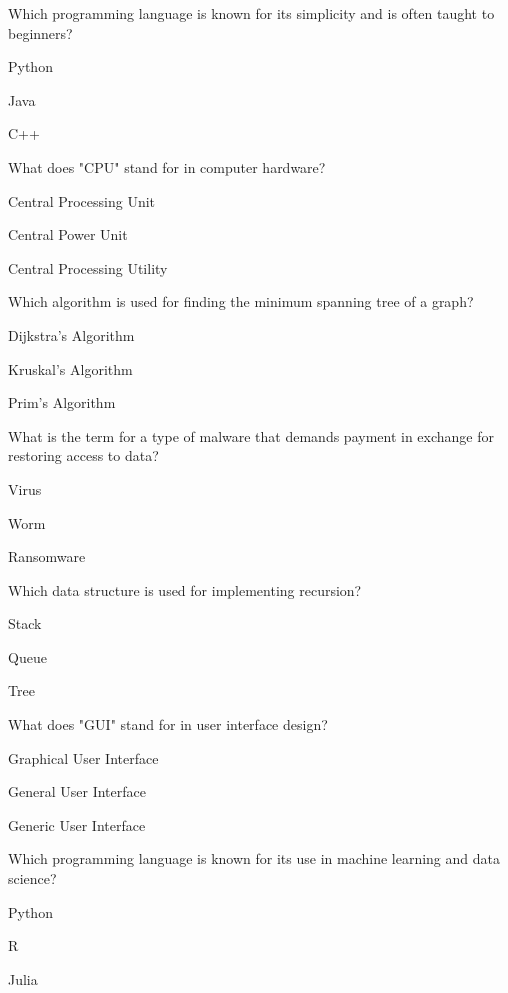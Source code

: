 \begin{enhancedmcq}{Which programming language is known for its simplicity and is often taught to beginners?}
\item Python
\item Java
\item C++

\end{enhancedmcq}
\begin{enhancedmcq}{What does "CPU" stand for in computer hardware?}
\item Central Processing Unit
\item Central Power Unit
\item Central Processing Utility

\end{enhancedmcq}
\begin{enhancedmcq}{Which algorithm is used for finding the minimum spanning tree of a graph?}
\item Dijkstra's Algorithm
\item Kruskal's Algorithm
\item Prim's Algorithm

\end{enhancedmcq}
\begin{enhancedmcq}{What is the term for a type of malware that demands payment in exchange for restoring access to data?}
\item Virus
\item Worm
\item Ransomware

\end{enhancedmcq}
\begin{enhancedmcq}{Which data structure is used for implementing recursion?}
\item Stack
\item Queue
\item Tree

\end{enhancedmcq}
\begin{enhancedmcq}{What does "GUI" stand for in user interface design?}
\item Graphical User Interface
\item General User Interface
\item Generic User Interface

\end{enhancedmcq}
\begin{enhancedmcq}{Which programming language is known for its use in machine learning and data science?}
\item Python
\item R
\item Julia

\end{enhancedmcq}
